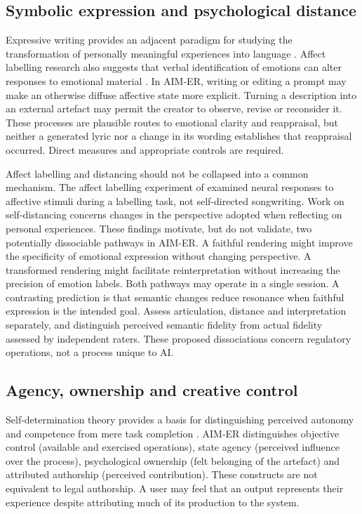 \documentclass[11pt,a4paper]{article}
\begin{document}
\subsection{Symbolic expression and psychological distance}
Expressive writing provides an adjacent paradigm for studying the transformation of personally meaningful experiences into language \citep{pennebaker1986}. Affect labelling research also suggests that verbal identification of emotions can alter responses to emotional material \citep{lieberman2007}. In AIM-ER, writing or editing a prompt may make an otherwise diffuse affective state more explicit. Turning a description into an external artefact may permit the creator to observe, revise or reconsider it. These processes are plausible routes to emotional clarity and reappraisal, but neither a generated lyric nor a change in its wording establishes that reappraisal occurred. Direct measures and appropriate controls are required.

Affect labelling and distancing should not be collapsed into a common mechanism. The affect labelling experiment of \citet{lieberman2007} examined neural responses to affective stimuli during a labelling task, not self-directed songwriting. Work on self-distancing \citep{kross2011} concerns changes in the perspective adopted when reflecting on personal experiences. These findings motivate, but do not validate, two potentially dissociable pathways in AIM-ER. A faithful rendering might improve the specificity of emotional expression without changing perspective. A transformed rendering might facilitate reinterpretation without increasing the precision of emotion labels. Both pathways may operate in a single session. A contrasting prediction is that semantic changes reduce resonance when faithful expression is the intended goal. Assess articulation, distance and interpretation separately, and distinguish perceived semantic fidelity from actual fidelity assessed by independent raters. These proposed dissociations concern regulatory operations, not a process unique to AI.

\subsection{Agency, ownership and creative control}
Self-determination theory provides a basis for distinguishing perceived autonomy and competence from mere task completion \citep{ryan2000}. AIM-ER distinguishes objective control (available and exercised operations), state agency (perceived influence over the process), psychological ownership (felt belonging of the artefact) and attributed authorship (perceived contribution). These constructs are not equivalent to legal authorship. A user may feel that an output represents their experience despite attributing much of its production to the system.
\end{document}
